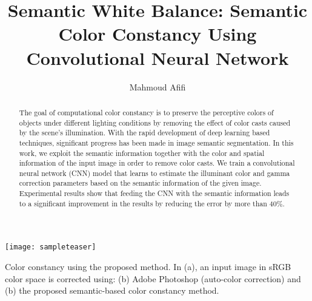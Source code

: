 \documentclass[sigplan]{acmart}
\begin{document}
\title{Semantic White Balance: Semantic Color Constancy Using Convolutional Neural Network}



\author{Mahmoud Afifi}




\begin{abstract}
The goal of computational color constancy is to preserve the perceptive colors of objects under different lighting conditions by removing the effect of color casts caused by the scene's illumination. With the rapid development of deep learning based techniques, significant progress has been made in image semantic segmentation. In this work, we exploit the semantic information together with the color and spatial information of the input image in order to remove color casts. We train a convolutional neural network (CNN) model that learns to estimate the illuminant color and gamma correction parameters based on the semantic information of the given image. Experimental results show that feeding the CNN with the semantic information leads to a significant improvement in the results by reducing the error by more than $40\%$. 
\end{abstract}




\begin{teaserfigure}
  \texttt{[image: sampleteaser]}
  \caption[Color constancy using the proposed method. In (a), an input image in sRGB color space is corrected using: (b) Adobe Photoshop (auto-color correction) and (b) the proposed semantic-based color constancy method.]{Color constancy using the proposed method. In (a), an input image in sRGB color space is corrected using: (b) Adobe Photoshop (auto-color correction) and (b) the proposed semantic-based color constancy method.}
  \label{fig:teaser}
\end{teaserfigure}


\maketitle
\end{document}
